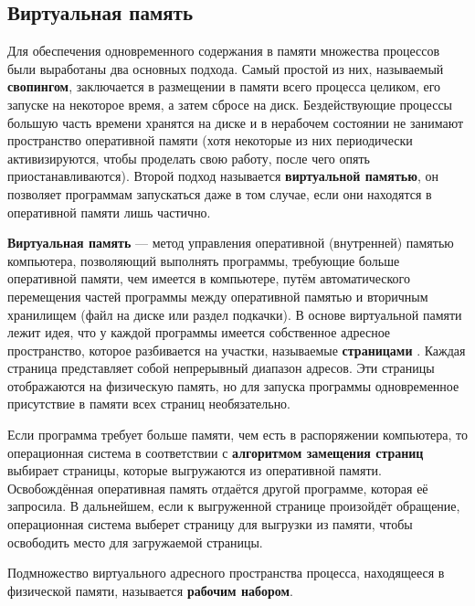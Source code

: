 \subsection{Виртуальная память}

Для обеспечения одновременного содержания в памяти множества процессов были выработаны два основных подхода. Самый простой из них, называемый \textbf{свопингом}, заключается в размещении в памяти всего процесса целиком, его запуске на некоторое время, а затем сбросе на диск. Бездействующие процессы большую часть времени хранятся на диске и в нерабочем состоянии не занимают пространство оперативной памяти (хотя некоторые из них периодически активизируются, чтобы проделать свою работу, после чего опять приостанавливаются). Второй подход называется \textbf{виртуальной памятью}, он позволяет программам запускаться даже в том случае, если они находятся в оперативной памяти лишь частично.

\textbf{Виртуальная память} --- метод управления оперативной (внутренней) памятью компьютера, позволяющий выполнять программы, требующие больше оперативной памяти, чем имеется в компьютере, путём автоматического перемещения частей программы между оперативной памятью и вторичным хранилищем (файл на диске или раздел подкачки). В основе виртуальной памяти лежит идея, что у каждой программы имеется собственное адресное пространство, которое разбивается на участки, называемые \textbf{страницами} \cite{tannenbaum}. Каждая страница представляет собой непрерывный диапазон адресов. Эти страницы отображаются на физическую память, но для запуска программы одновременное присутствие в памяти всех страниц необязательно.

Если программа требует больше памяти, чем есть в распоряжении компьютера, то операционная система в соответствии с \textbf{алгоритмом замещения страниц} \cite{tannenbaum} выбирает страницы, которые выгружаются из оперативной памяти. Освобождённая оперативная память отдаётся другой программе, которая её запросила. В дальнейшем, если к выгруженной странице произойдёт обращение, операционная система выберет страницу для выгрузки из памяти, чтобы освободить место для загружаемой страницы.

Подмножество виртуального адресного пространства процесса, находящееся в физической памяти, называется \textbf{рабочим набором}. \cite{windows}


